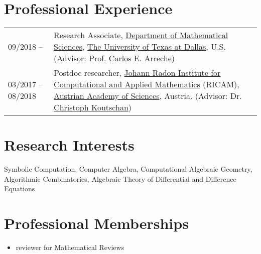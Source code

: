 \documentclass[a4paper,12pt]{article}
\begin{document}
\section*{\Large{Professional Experience}}
\begin{tabular}{@{}p{1.4in}p{4in}}
09/2018 --            & Research Associate, \href{https://www.utdallas.edu/math/}{Department of Mathematical Sciences}, 
                        \href{https://www.utdallas.edu/}{The University of Texas at Dallas}, U.S. 
                        (Advisor: Prof. \href{https://www.utdallas.edu/~arreche/}{Carlos E. Arreche}) \\    
03/2017 -- 08/2018    & Postdoc researcher, 
                        \href{https://www.ricam.oeaw.ac.at/}{Johann Radon Institute for Computational and Applied Mathematics} (RICAM),
                        \href{http://www.oeaw.ac.at/en/austrian-academy-of-sciences/}{Austrian Academy of Sciences}, Austria. 
                        (Advisor: Dr. \href{http://www.koutschan.de/}{Christoph Koutschan})\\
\end{tabular}

\section*{\Large{Research Interests}}
Symbolic Computation, Computer Algebra, Computational Algebraic Geometry, Algorithmic Combinatorics, 
Algebraic Theory of Differential and Difference Equations

\section*{Professional Memberships}
\begin{itemize}
 \item reviewer for Mathematical Reviews
\end{itemize}

%
%
\end{document}
